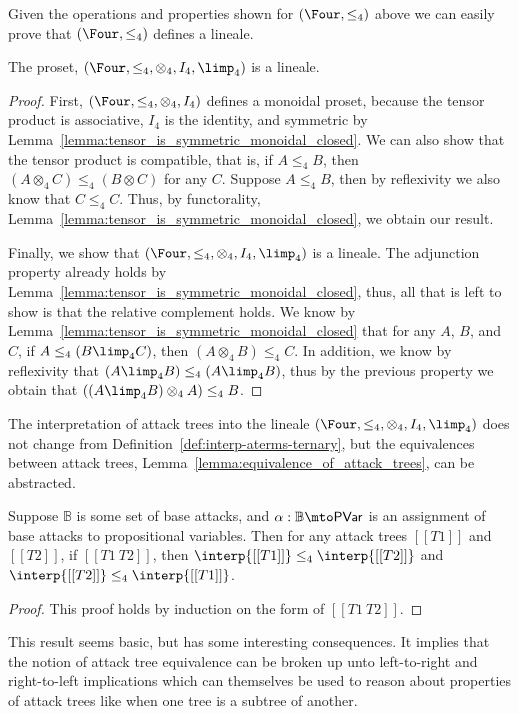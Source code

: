 Given the operations and properties shown for $(\Four, \leq_4)$ above
we can easily prove that $(\Four, \leq_4)$ defines a lineale.
\begin{lemma}
  \label{lemma:four_is_a_lineale}
  The proset, $(\Four, \leq_4, \otimes_4, I_4, \limp_4)$ is a lineale.
\end{lemma}
\begin{proof}
  First, $(\Four, \leq_4, \otimes_4, I_4)$ defines a monoidal proset,
  because the tensor product is associative, $I_4$ is the identity,
  and symmetric by
  Lemma~\ref{lemma:tensor_is_symmetric_monoidal_closed}.  We can also
  show that the tensor product is compatible, that is, if $A \leq_4
  B$, then $(A \otimes_4 C) \leq_4 (B \otimes C)$ for any $C$.
  Suppose $A \leq_4 B$, then by reflexivity we also know that $C
  \leq_4 C$.  Thus, by functorality,
  Lemma~\ref{lemma:tensor_is_symmetric_monoidal_closed}, we obtain our
  result.

  Finally, we show that $(\Four, \leq_4, \otimes_4, I_4, \limp_4)$ is
  a lineale.  The adjunction property already holds by
  Lemma~\ref{lemma:tensor_is_symmetric_monoidal_closed}, thus, all
  that is left to show is that the relative complement holds. We know
  by Lemma~\ref{lemma:tensor_is_symmetric_monoidal_closed} that for
  any $A$, $B$, and $C$, if $A \leq_4 (B \limp_4 C)$, then $(A
  \otimes_4 B) \leq_4 C$.  In addition, we know by reflexivity that
  $(A \limp_4 B) \leq_4 (A \limp_4 B)$, thus by the previous property we obtain
  that $((A \limp_4 B) \otimes_4 A) \leq_4 B$.
\end{proof}

The interpretation of attack trees into the lineale $(\Four, \leq_4,
\otimes_4, I_4, \limp_4)$ does not change from
Definition~\ref{def:interp-aterms-ternary}, but the equivalences
between attack trees, Lemma~\ref{lemma:equivalence_of_attack_trees},
can be abstracted.
\begin{lemma}
  \label{lemma:equivalence_of_attack_trees_lineale}
  Suppose $\mathbb{B}$ is some set of base attacks, and $\alpha :
  \mathbb{B} \mto \mathsf{PVar}$ is an assignment of base attacks to
  propositional variables.  Then for any attack trees $[[T1]]$ and
  $[[T2]]$, if $[[T1 ~ T2]]$, then $\interp{[[T1]]} \leq_4
  \interp{[[T2]]}$ and $\interp{[[T2]]} \leq_4 \interp{[[T1]]}$.
\end{lemma}
\begin{proof}
  This proof holds by induction on the form of $[[T1 ~ T2]]$.
\end{proof}
This result seems basic, but has some interesting consequences.  It
implies that the notion of attack tree equivalence can be broken up
unto left-to-right and right-to-left implications which can themselves
be used to reason about properties of attack trees like when one tree
is a subtree of another.

